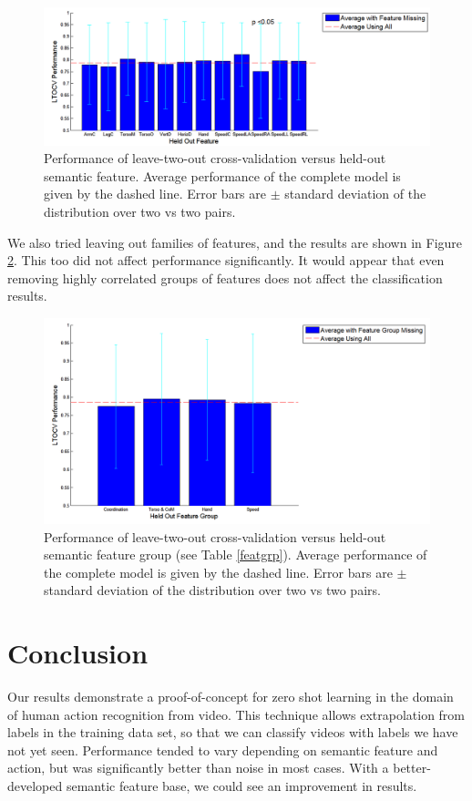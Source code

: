\documentclass{article}
\begin{document}
\begin{figure}[h]
  \centering
  \includegraphics[width=.9\linewidth]{feature_snap}
  \caption{Performance of leave-two-out cross-validation versus held-out semantic feature. Average performance of the complete model is given by the dashed line. Error bars are $\pm$ standard deviation of the distribution over two vs two pairs.}
  \label{featplot}
\end{figure}

We also tried leaving out families of features, and the results are shown in Figure \ref{featgplot}.  This too did not affect performance significantly. It would appear that even removing highly correlated groups of features does not affect the classification results.

\begin{figure}[h]
  \centering
  \includegraphics[width=.9\linewidth]{featuregrp_snap}
  \caption{Performance of leave-two-out cross-validation versus held-out semantic feature group (see Table \ref{featgrp}). Average performance of the complete model is given by the dashed line. Error bars are $\pm$ standard deviation of the distribution over two vs two pairs.}
  \label{featgplot}
\end{figure}

\section{Conclusion}
Our results demonstrate a proof-of-concept for zero shot learning in the domain of human action recognition from video. This technique allows extrapolation from labels in the training data set, so that we can classify videos with labels we have not yet seen.  Performance tended to vary depending on semantic feature and action, but was significantly better than noise in most cases. With a better-developed semantic feature base, we could see an improvement in results.



\end{document}
